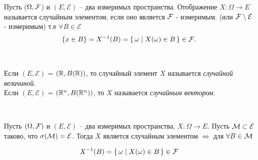   
                  
\begin{definition}
	Пусть ($\Omega, \mathcal{F}$) и $(E, \mathcal{E})$ -- два измеримых пространства. 
  Отображение $X\colon \Omega \to E$ называется случайным элементом,
   если оно является $\mathcal{F}$ - измеримым. (или $\mathcal{F} \setminus \mathcal{E}$ - измеримым) 
   т.е $\forall B \in \mathcal{E}$
  \begin{align*}
    \{ x \in B \} = X^{-1}(B) = \left\{ \, \omega \mid X(\omega) \in B \, \right\} \in \mathcal{F}.
  \end{align*}
\end{definition}

\begin{definition}~

  Если $(E, \mathcal{E})$ = $(\mathbb{R}, B(\mathbb{R}))$, то случайный элемент $X$ 
  называется \emph{случайной величиной}.\\

  Если $(E, \mathcal{E})$ = $(\mathbb{R}^n, B(\mathbb{R}^n))$, то $X$ называется \emph{случайным вектором}.\\
\end{definition}

\begin{lemma}~

  Пусть $(\Omega, \mathcal{F})$ и $(E, \mathcal{E})$ -- два измеримых пространства, 
  $X\colon \Omega \to E$.
  Пусть $\mathcal{M} \subset \mathcal{E}$ таково, что $\sigma(\mathcal{M}) = \mathcal{E}$. 
  Тогда $X$ является случайным элементом $\iff$ для $\forall B \in \mathcal{M}$

  \begin{align*}
    X^{-1}(B) = \left\{ \, \omega \mid X(\omega) \in B \, \right\} \in \mathcal{F}
  \end{align*}

\end{lemma}

